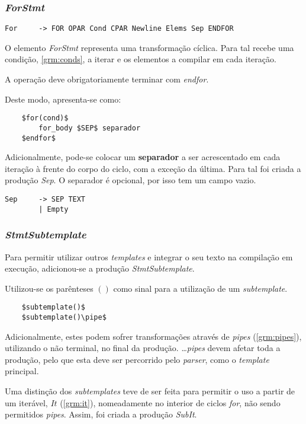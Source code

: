 \documentclass[../relatorio.tex]{subfiles}
\begin{document}
\subsubsection{\textit{ForStmt}} \label{grm:forstmt}
\begin{verbatim}
For     -> FOR OPAR Cond CPAR Newline Elems Sep ENDFOR  
\end{verbatim}

O elemento \textit{ForStmt} representa uma transformação cíclica.
Para tal recebe uma condição, \ref{grm:conds}, a iterar 
e os elementos a compilar em cada iteração.

A operação deve obrigatoriamente terminar com \textit{endfor}.

Deste modo, apresenta-se como:
\begin{verbatim}
    $for(cond)$
        for_body $SEP$ separador
    $endfor$
\end{verbatim}

Adicionalmente, pode-se colocar um \textbf{separador} a ser acrescentado
em cada iteração à frente do corpo do ciclo, com a exceção da última.
Para tal foi criada a produção \textit{Sep}.
O separador é opcional, por isso tem um campo vazio.

\begin{verbatim}
Sep     -> SEP TEXT
        | Empty
\end{verbatim}

\subsubsection{\textit{StmtSubtemplate}} \label{grm:sub}
Para permitir utilizar outros \textit{templates} e integrar
o seu texto na compilação em execução, adicionou-se a produção \textit{StmtSubtemplate}.

Utilizou-se os parênteses $()$ como sinal para a utilização de um \textit{subtemplate}.

\begin{verbatim}
    $subtemplate()$
    $subtemplate()\pipe$
\end{verbatim}

Adicionalmente, estes podem sofrer transformações através de \textit{pipes} (\ref{grm:pipes}),
utilizando o não terminal, no final da produção.
\dots \textit{pipes} devem afetar toda a produção, pelo que esta deve ser 
percorrido pelo \textit{parser}, como o \textit{template} principal.

Uma distinção dos \textit{subtemplates}
teve de ser feita para permitir o uso a partir
de um iterável, $It$ (\ref{grm:it}),
nomeadamente no interior de ciclos \textit{for}, não sendo permitidos \textit{pipes}.
Assim, foi criada a produção \textit{SubIt}.
\end{document}
